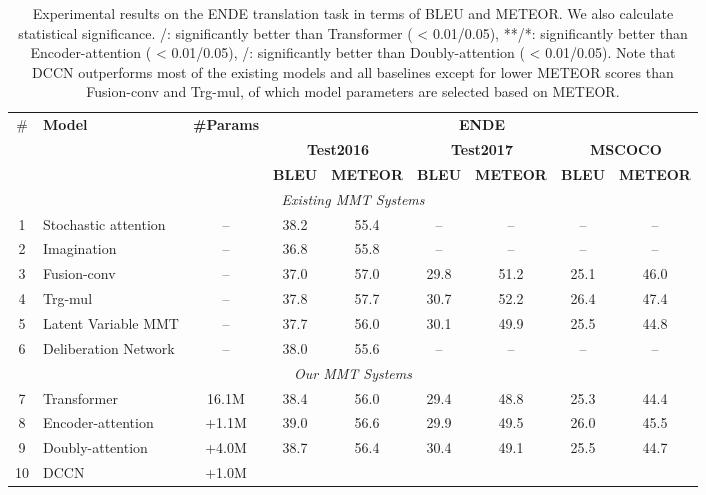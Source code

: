 \documentclass[sigconf]{acmart}
\begin{document}
\begin{table*}[!t]
\centering
\footnotesize
\begin{tabular}{c|l|c|cc|cc|cc}
\hline
\multirow{3}{*}{\#} & \multirow{3}{*}{\bf Model} & \multirow{3}{*}{\bf\#Params} &\multicolumn{6}{c}{\textbf{ENDE}}\\
\cline{4-9}
& & &\multicolumn{2}{|c|}{\textbf{Test2016}}  &\multicolumn{2}{|c|}{\textbf{Test2017}}  &\multicolumn{2}{c}{\textbf{MSCOCO}}\\
\cline{4-9}
& & &\textbf{BLEU} & \textbf{METEOR} &\textbf{BLEU} & \textbf{METEOR}  &\textbf{BLEU} & \textbf{METEOR}\\
\hline
\hline
\multicolumn{9}{c}{\emph{Existing MMT Systems}} \\
\hline
1  &Stochastic attention \cite{Delbrouck:EMNLP17}        &--   & 38.2 & 55.4  & --   & --    & --   & -- \\
2  &Imagination \cite{elliott2017imagination}            &--   & 36.8 & 55.8  & --   & --    & --   & -- \\
3  &Fusion-conv \cite{caglayan2017lium}                  &--   & 37.0 & 57.0  & 29.8 & 51.2  & 25.1 & 46.0 \\
4  &Trg-mul \cite{caglayan2017lium}                      &--   & 37.8 & 57.7  & 30.7 & 52.2  & 26.4 & 47.4 \\
5  &Latent Variable MMT \cite{calixto2019latent}         &--   & 37.7 & 56.0  & 30.1 & 49.9  & 25.5 & 44.8 \\
6  &Deliberation Network \cite{acl19:twopass}            &--   & 38.0 & 55.6  & --   & --    & --   & -- \\
\hline
\multicolumn{9}{c}{\emph{Our MMT Systems}} \\
\hline
7  &Transformer \cite{vaswani2017attention}            & 16.1M & 38.4 & 56.0   & 29.4 & 48.8    & 25.3 & 44.4 \\
8 &Encoder-attention \cite{Delbrouck:NIPS17workshop}   & +1.1M & 39.0 & 56.6   & 29.9 & 49.5      & 26.0 & 45.5 \\
9 &Doubly-attention \cite{helcl2018cuni}               & +4.0M & 38.7 & 56.4   & 30.4 & 49.1      & 25.5 & 44.7 \\	
\hline
10 &DCCN  & +1.0M 
&  &    
&  &    
&   &   \\
\hline
\end{tabular}
\caption{
\label{Table_En2DeMainResults}
Experimental results on the ENDE translation task in terms of BLEU and METEOR. We also calculate statistical significance. /: significantly better than Transformer ( < 0.01/0.05), **/*: significantly better than Encoder-attention ( < 0.01/0.05), /: significantly better than Doubly-attention ( < 0.01/0.05). Note that DCCN outperforms most of the existing models and all baselines except for lower METEOR scores than Fusion-conv and Trg-mul, of which model parameters are selected based on METEOR.
\vspace{-10pt}
}
\end{table*}
\end{document}
